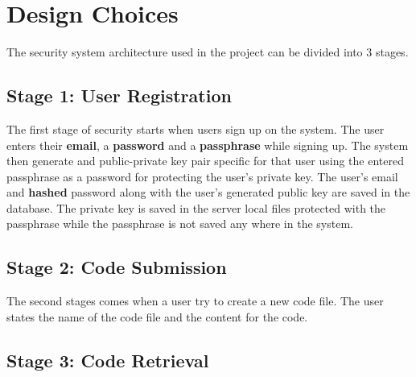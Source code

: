 \chapter{Design Choices}

The security system architecture used in the project can be divided into 3 stages.

\section{Stage 1: User Registration}

The first stage of security starts when users sign up on the system. The user enters their \textbf{email}, a \textbf{password} and a \textbf{passphrase} while signing up. The system then generate and public-private key pair specific for that user using the entered passphrase as a password for protecting the user's private key. The user's email and \textbf{hashed} password along with the user's generated public key are saved in the database. The private key is saved in the server local files protected with the passphrase while the passphrase is not saved any where in the system.

\section{Stage 2: Code Submission}

The second stages comes when a user try to create a new code file. The user states the name of the code file and the content for the code.

\section{Stage 3: Code Retrieval}